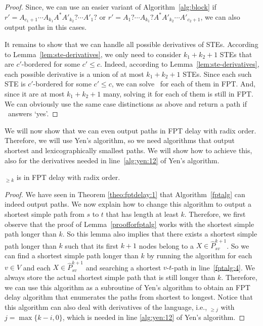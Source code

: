 \documentclass[a4paper,english]{lipics-v2016}
\theoremstyle{plain}
\begin{document}
\begin{proof}
Since, we can use an easier variant of Algorithm~\ref{alg:block} if $r' = A_{c_1+1} \cdots A_{k_1} A^* A'_{k_2}? \cdots A'_{1}?$ or $r' = A_{1}? \cdots A_{k_1}? A^* A'_{k_2} \cdots A'_{c_2+1}$, we can also output paths in this cases.


It remains to show that we can handle all possible derivatives of
STEs. According to Lemma~\ref{lem:ste-derivatives}, we only need to
consider $k_1+k_2+1$ STEs that are $c'$-bordered for some $c' \leq
c$. 
Indeed, according to Lemma~\ref{lem:ste-derivatives}, each possible derivative is a union of at most $k_1+k_2+1$ STEs. Since each such STE is $c'$-bordered for some $c' \leq c$, we can solve \nodesimpath\ for each of them in FPT. And, since it are at most $k_1+k_2+1$ many, solving it for each of them is still in FPT. We can obviously use the same case distinctions as above and return a path if \nodesimpath\ answers `yes'.  \end{proof}



 We will now show that we can even output paths in FPT delay with radix order. Therefore, we will use Yen's algorithm, so we need algorithms that output shortest and lexicographically smallest paths. We will show how to achieve this, also for the derivatives needed in line~\ref{alg:yen:12} of Yen's algorithm.
 \begin{lemma}\enumeratesimpaths$_{\geq k}$ is in FPT delay with radix order. \label{lemma:a-geqk-shortest}
 \end{lemma}
 \begin{proof}
 We have seen in Theorem \ref{theo:fptdelay:1} that Algorithm~\ref{fptalg} can indeed output paths. 
 We now explain how to change this algorithm to output a shortest simple path from $s$ to $t$ that has length at least $k$.
 Therefore, we first observe that the proof of Lemma~\ref{proofforfptalg} works with the shortest simple path longer than $k$. So this lemma also implies that there exists a shortest simple path longer than $k$ such that its first $k+1$ nodes belong to a $X \in \hat{P}^{k+1}_{sv}$. 
 So we can find a shortest simple path longer than $k$ by running the algorithm for each $v \in V$ and each $X \in \hat{P}^{k+1}_{sv}$ and searching a shortest $v$-$t$-path in line~\ref{fptalg:4}. We always store the actual shortest simple path that is still longer than $k$. 
  Therefore, we can use this
   algorithm as a subroutine of Yen's algorithm to obtain an FPT delay
   algorithm that enumerates the paths from shortest to longest. 
   Notice that this algorithm can also deal with derivatives of the language, i.e.,  \nodesimpath$_{\geq j}$ with $j = \max\{k-i,0\}$, which is needed in line \ref{alg:yen:12} of Yen's algorithm.
  \end{proof}
\end{document}
